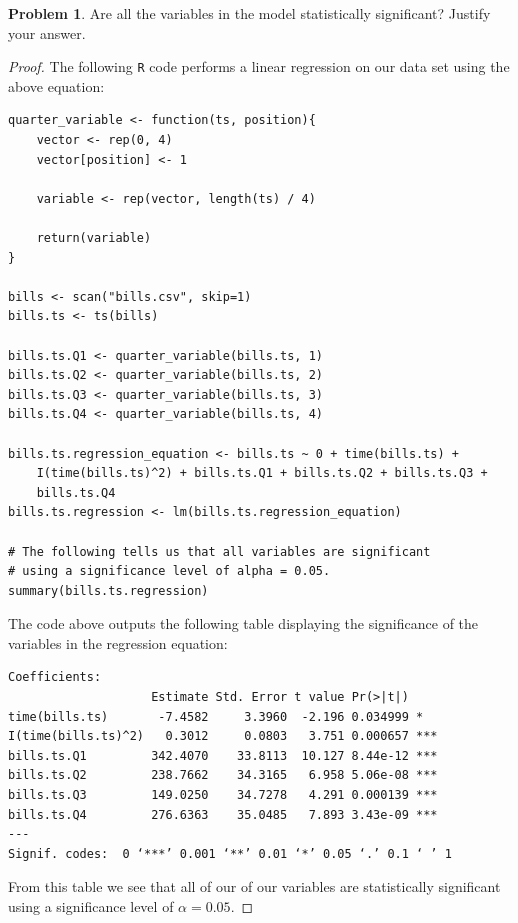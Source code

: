 \documentclass[12pt]{article}
\theoremstyle{definition}
\newtheorem{problem}{Problem}
\begin{document}
\begin{problem}
  Are all the variables in the model statistically significant? Justify your answer.
\end{problem}

\begin{proof}
  The following \texttt{R} code performs a linear regression on our data set using the
  above equation:
  \begin{verbatim}
quarter_variable <- function(ts, position){
    vector <- rep(0, 4)
    vector[position] <- 1

    variable <- rep(vector, length(ts) / 4)

    return(variable)
}

bills <- scan("bills.csv", skip=1)
bills.ts <- ts(bills)

bills.ts.Q1 <- quarter_variable(bills.ts, 1)
bills.ts.Q2 <- quarter_variable(bills.ts, 2)
bills.ts.Q3 <- quarter_variable(bills.ts, 3)
bills.ts.Q4 <- quarter_variable(bills.ts, 4)

bills.ts.regression_equation <- bills.ts ~ 0 + time(bills.ts) +
    I(time(bills.ts)^2) + bills.ts.Q1 + bills.ts.Q2 + bills.ts.Q3 +
    bills.ts.Q4
bills.ts.regression <- lm(bills.ts.regression_equation)

# The following tells us that all variables are significant
# using a significance level of alpha = 0.05.
summary(bills.ts.regression)

  \end{verbatim}

  The code above outputs the following table displaying the significance of the
  variables in the regression equation:
  \begin{verbatim}
Coefficients:
                    Estimate Std. Error t value Pr(>|t|)
time(bills.ts)       -7.4582     3.3960  -2.196 0.034999 *
I(time(bills.ts)^2)   0.3012     0.0803   3.751 0.000657 ***
bills.ts.Q1         342.4070    33.8113  10.127 8.44e-12 ***
bills.ts.Q2         238.7662    34.3165   6.958 5.06e-08 ***
bills.ts.Q3         149.0250    34.7278   4.291 0.000139 ***
bills.ts.Q4         276.6363    35.0485   7.893 3.43e-09 ***
---
Signif. codes:  0 ‘***’ 0.001 ‘**’ 0.01 ‘*’ 0.05 ‘.’ 0.1 ‘ ’ 1

  \end{verbatim}

From this table we see that all of our of our variables are statistically significant
using a significance level of $\alpha=0.05$.
\end{proof}
\end{document}
